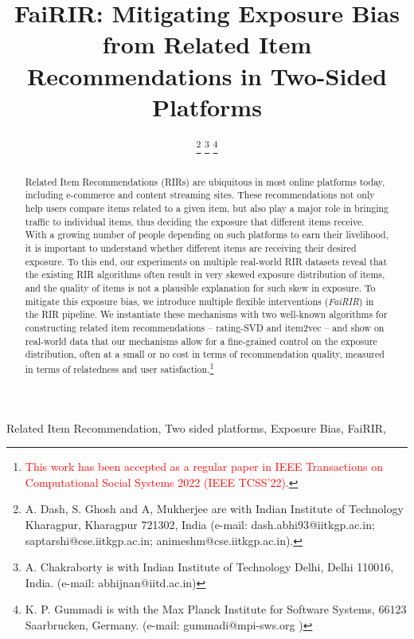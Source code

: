 \documentclass[lettersize,journal]{IEEEtran}
\begin{document}
	\title{FaiRIR: Mitigating Exposure Bias from Related Item Recommendations in Two-Sided Platforms}

	
	 
	\author{
	\thanks{A. Dash, S. Ghosh and A, Mukherjee are with Indian Institute of Technology Kharagpur, Kharagpur 721302, India 
	(e-mail: dash.abhi93@iitkgp.ac.in; saptarshi@cse.iitkgp.ac.in; animeshm@cse.iitkgp.ac.in).}
	\thanks{A. Chakraborty is with Indian Institute of Technology Delhi, Delhi 110016, India. (e-mail: abhijnan@iitd.ac.in)
	}
	\thanks{K. P. Gummadi is with the Max Planck Institute for Software Systems, 66123 Saarbrucken, Germany. (e-mail: gummadi@mpi-sws.org )}
	}
	
	\maketitle	
	\begin{abstract}
		Related Item Recommendations (RIRs) are ubiquitous in most online platforms today, including e-commerce and content streaming sites. These recommendations not only help users compare items related to a given item, but also play a major role in bringing traffic to individual items, thus deciding the exposure that different items receive. 
		With a growing number of people depending on such platforms to earn their livelihood, it is important to understand whether different items are receiving their desired exposure.  
		To this end, our experiments on multiple real-world RIR datasets reveal that the existing RIR algorithms often result in very skewed exposure distribution of items, and the quality of items is not a plausible explanation for such skew in exposure.
		To mitigate this exposure bias, we introduce multiple flexible interventions (\textit{FaiRIR}) in the RIR pipeline. We instantiate these mechanisms with two well-known algorithms for constructing related item recommendations -- rating-SVD and item2vec -- and show on real-world data that our mechanisms allow for a fine-grained control on the exposure distribution, often at a small or no cost in terms of recommendation quality, measured in terms of relatedness and user satisfaction.\footnote{\textcolor{red}{This work has been accepted as a regular paper in IEEE Transactions on Computational Social Systems 2022 (IEEE TCSS'22).}}
	\end{abstract}
	\begin{IEEEkeywords}
		Related Item Recommendation, Two sided platforms, Exposure Bias, FaiRIR, 
	\end{IEEEkeywords}
	
	
	
	
	
	
	
	
	 
\end{document}
